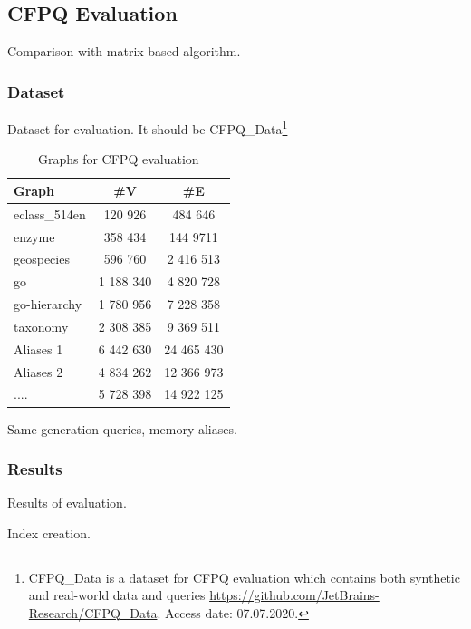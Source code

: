 \subsection{CFPQ Evaluation}

Comparison with matrix-based algorithm.

\subsubsection{Dataset}

Dataset for evaluation. 
It should be CFPQ\_Data\footnote{CFPQ\_Data is a dataset for CFPQ evaluation which contains both synthetic and real-world data and queries \url{https://github.com/JetBrains-Research/CFPQ\_Data}. Access date: 07.07.2020.}

\begin{table}
{
\begin{tabular}{|l|c|c|}
\hline
Graph & \#V & \#E \\
\hline
\hline 
eclass\_514en  & 120 926 & 484 646 \\
enzyme  & 358 434 & 144 9711 \\
geospecies  & 596 760 & 2 416 513 \\
go   & 1 188 340 & 4 820 728 \\
go-hierarchy & 1 780 956 & 7 228 358 \\
taxonomy & 2 308 385 & 9 369 511 \\
\hline
Aliases 1 & 6 442 630 & 24 465 430 \\
Aliases 2 & 4 834 262 & 12 366 973 \\
.... & 5 728 398 & 14 922 125 \\
\hline
\end{tabular}
}
\caption{Graphs for CFPQ evaluation}
\label{tbl:graphs_for_cfpq}
\end{table}



Same-generation queries, memory aliases.

\subsubsection{Results}

Results of evaluation.

Index creation.

